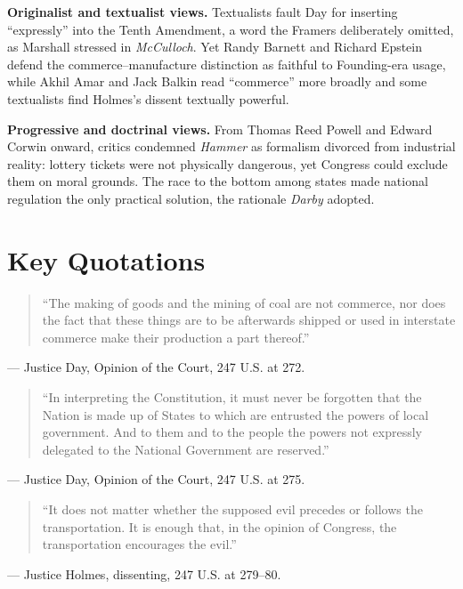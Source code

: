 \documentclass[12pt]{article}
\begin{document}
\textbf{Originalist and textualist views.} Textualists fault Day for inserting ``expressly'' into the Tenth Amendment, a word the Framers deliberately omitted, as Marshall stressed in \textit{McCulloch}. Yet Randy Barnett and Richard Epstein defend the commerce--manufacture distinction as faithful to Founding-era usage, while Akhil Amar and Jack Balkin read ``commerce'' more broadly and some textualists find Holmes's dissent textually powerful.

\textbf{Progressive and doctrinal views.} From Thomas Reed Powell and Edward Corwin onward, critics condemned \textit{Hammer} as formalism divorced from industrial reality: lottery tickets were not physically dangerous, yet Congress could exclude them on moral grounds. The race to the bottom among states made national regulation the only practical solution, the rationale \textit{Darby} adopted.

\section{Key Quotations}

\begin{quote}
``The making of goods and the mining of coal are not commerce, nor does the fact that these things are to be afterwards shipped or used in interstate commerce make their production a part thereof.''
\end{quote}
\noindent --- Justice Day, Opinion of the Court, 247 U.S. at 272.

\begin{quote}
``In interpreting the Constitution, it must never be forgotten that the Nation is made up of States to which are entrusted the powers of local government. And to them and to the people the powers not expressly delegated to the National Government are reserved.''
\end{quote}
\noindent --- Justice Day, Opinion of the Court, 247 U.S. at 275.

\begin{quote}
``It does not matter whether the supposed evil precedes or follows the transportation. It is enough that, in the opinion of Congress, the transportation encourages the evil.''
\end{quote}
\noindent --- Justice Holmes, dissenting, 247 U.S. at 279--80.
\end{document}
